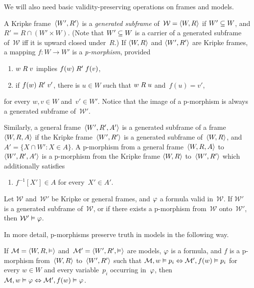 \documentclass[leqno,draft,11pt]{article}
\let\frm\mathcal
\begin{document}
We will also need basic validity-preserving operations on frames and models.
\begin{Def}\th\label{def:frameops}
A Kripke frame~$\langle W',R'\rangle$ is a \emph{generated subframe} of~$\frm W=\p{W,R}$
if $W'\subseteq W$, and $R'=R\cap(W'\times W)$. (Note that $W'\subseteq W$ is
a carrier of a generated subframe of~$\frm W$ iff it is upward closed
under~$R$.) If $\langle W,R\rangle$ and $\langle W',R'\rangle$ are Kripke frames, a mapping
$f\colon W\to W'$ is a \emph{p-morphism}, provided
\begin{enumerate}
\item $w\mathrel Rv$ implies $f(w)\mathrel{R'}f(v)$,
\item if $f(w)\mathrel{R'}v'$, there is $u\in W$ such that $w\mathrel Ru$ and~$f(u)=v'$,
\end{enumerate}
for every $w,v\in W$ and~$v'\in W'$. Notice that the image of a
p-morphism is always a generated subframe of~$\frm{W'}$.

Similarly, a general frame~$\langle W',R',A'\rangle$ is a generated subframe of a
frame~$\langle W,R,A\rangle$ if the Kripke frame~$\langle W',R'\rangle$ is a generated
subframe of~$\langle W,R\rangle$, and $A'=\{X\cap W':X\in A\}$. A p-morphism from
a general frame~$\langle W,R,A\rangle$ to~$\langle W',R',A'\rangle$ is a p-morphism from the
Kripke frame $\langle W,R\rangle$ to~$\langle W',R'\rangle$ which additionally satisfies
\begin{enumerate}
\setcounter{enumi}2
\item $f^{-1}[X']\in A$ for every~$X'\in A'$.
\end{enumerate}
\end{Def}
\begin{Fact}\th\label{fact:pres}
Let $\frm W$ and~$\frm{W'}$ be Kripke or general frames, and $\varphi$ a
formula valid in~$\frm W$. If $\frm{W'}$ is a generated subframe
of~$\frm W$, or if there exists a p-morphism from~$\frm W$
onto~$\frm{W'}$, then $\frm{W'}\model\fii$.
\noproof\end{Fact}
In more detail, p-morphisms preserve truth in models in the following
way.
\begin{Fact}\th\label{fact:modpres}
If $\frm M=\p{W,R,{\model}}$ and~$\frm M'=\p{W',R',{\model}}$ are
models, $\varphi$ is a formula, and $f$ is a p-morphism from~$\langle W,R\rangle$ to~$\langle W',R'\rangle$ such
that $\frm M,w\model p_i\EQ\frm M',f(w)\model p_i$ for every $w\in
W$ and every variable~$p_i$ occurring in~$\varphi$, then $\frm
M,w\model\fii\EQ\frm M',f(w)\model\fii$.
\noproof\end{Fact}
\end{document}
